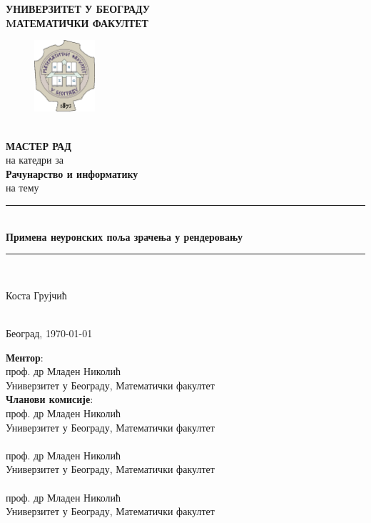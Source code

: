 \documentclass[12pt, a4paper, twoside]{book}
\numberwithin{equation}{chapter}
\numberwithin{theorem}{section}
\numberwithin{definition}{section}
\numberwithin{definitionChapter}{chapter}
\begin{document}
	
\begin{titlepage}
	\newcommand{\HRule}{\rule{\linewidth}{0.5mm}}
	\center
	
	\textbf{\LARGE УНИВЕРЗИТЕТ У БЕОГРАДУ\\MАТЕМАТИЧКИ ФАКУЛТЕТ}
	\begin{figure}[!ht]
		\centering
		\includegraphics[width=0.2\textwidth]{img/matf-logo.png}
	\end{figure}\\[3cm]
	\textbf{\Large МАСТЕР РАД}\\[0.3cm]
	на катедри за \\[0.3cm]
	\textbf{\Large Рачунарство и информатику}\\[.7cm] %
	на тему\\[0.7cm]
	
	\HRule \\[0.4cm]
	{ \huge \bfseries Примена неуронских поља зрачења у рендеровању}\\[0.4cm] %
	\HRule \\[1.5cm]
	
	\begin{minipage}{0.4\textwidth}
		\begin{center}
			Коста Грујчић
		\end{center}
	\end{minipage}\\[5cm]
	
	{\large Београд, \today}\\[2.5cm]
	\vfill
\end{titlepage}

\newpage
\thispagestyle{empty}

\hspace{0pt}
\vfill
\noindent \textbf{Ментор}:\\
проф. др Младен Николић\\Универзитет у Београду, Математички факултет
\\[2cm]

\noindent \textbf{Чланови комисије}:
\\проф. др Младен Николић\\Универзитет у Београду, Математички факултет
\\[0.25cm]
\\проф. др Младен Николић\\Универзитет у Београду, Математички факултет
\\[0.25cm]
\\проф. др Младен Николић\\Универзитет у Београду, Математички факултет
\\[2cm]
\end{document}
